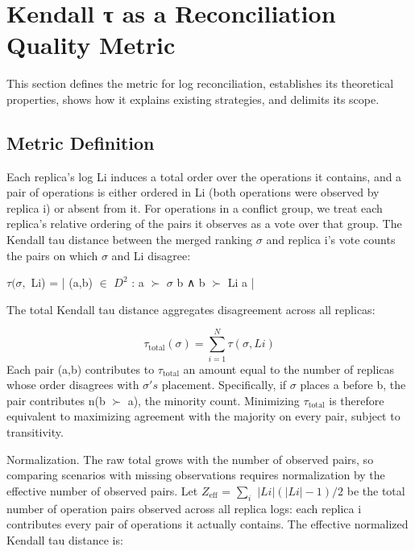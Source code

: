 \documentclass[10pt,twocolumn]{article}
\begin{document}
\section{Kendall τ as a Reconciliation Quality Metric}
This section defines the metric for log reconciliation, establishes its theoretical properties, shows how it explains existing strategies, and delimits its scope.

\subsection{Metric Definition}
Each replica's log Li induces a total order over the operations it contains, and a pair of operations is either ordered in Li (both operations were observed by replica i) or absent from it. For operations in a conflict group, we treat each replica's relative ordering of the pairs it observes as a vote over that group. The Kendall tau distance between the merged ranking $\sigma$ and replica i's vote counts the pairs on which $\sigma$ and Li disagree:

$\tau(\sigma,$ Li) = |{ (a,b) $\in$ $D^{2}$ : a $\succ$ $\sigma$ b ∧ b $\succ$ Li a }|

The total Kendall tau distance aggregates disagreement across all replicas:

\[ \tau_{\mathrm{total}}(\sigma) = \sum_{i=1}^{N} \tau(\sigma, Li) \]
Each pair (a,b) contributes to $\tau_{\mathrm{total}}$ an amount equal to the number of replicas whose order disagrees with $\sigma's$ placement. Specifically, if $\sigma$ places a before b, the pair contributes n(b $\succ$ a), the minority count. Minimizing $\tau_{\mathrm{total}}$ is therefore equivalent to maximizing agreement with the majority on every pair, subject to transitivity.

Normalization. The raw total grows with the number of observed pairs, so comparing scenarios with missing observations requires normalization by the effective number of observed pairs. Let $Z_{\mathrm{eff}}$ = $\sum_{i}$ $|Li|(|Li|-1)/2$ be the total number of operation pairs observed across all replica logs: each replica i contributes every pair of operations it actually contains. The effective normalized Kendall tau distance is:
\end{document}
